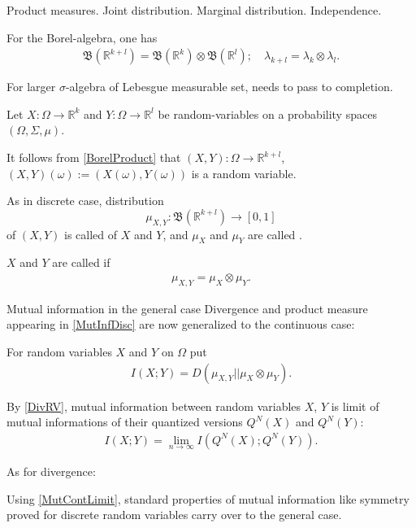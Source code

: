 \begin{frame}{Product measures. Joint distribution. Marginal distribution. Independence.}
\bit
\item For the Borel-algebra, one has
\begin{align}\label{BorelProduct}
\mathfrak{B}(\mathbb{R}^{k+l})=\mathfrak{B}(\mathbb{R}^{k})\otimes\mathfrak{B}(\mathbb{R}^l); \quad 
\lambda_{k+l}=\lambda_{k}\otimes\lambda_l.
\end{align}
\item For larger $\sigma$-algebra of Lebesgue measurable set, needs to pass to completion. 
\eit

\bit 
\item Let $X:\Omega\to\mathbb{R}^k$ and $Y:\Omega\to\mathbb{R}^l$ be random-variables on a probability spaces $(\Omega,\Sigma,\mu)$. 
\item It follows from \eqref{BorelProduct} that $(X,Y):\Omega\to\mathbb{R}^{k+l}$, $(X,Y)(\omega):=(X(\omega),Y(\omega))$ is a random variable. 
\item As in discrete case, distribution
\[
\mu_{X,Y}: \mathfrak{B}(\mathbb{R}^{k+l}) \to[0,1]
\]
of $(X,Y)$ is called  of $X$ and $Y$, and  
$\mu_X$ and $\mu_Y$ are called . 
\item $X$ and $Y$ are called  if 
\begin{align*}
\mu_{X,Y}=\mu_X\otimes\mu_Y. 
\end{align*}  
\eit
\end{frame}

\begin{frame}{Mutual information in the general case} 
Divergence and product measure appearing in \eqref{MutInfDisc} 
are now generalized to the continuous case: 

\bit
\item For random variables $X$ and $Y$ on $\Omega$ put 
\begin{align}\label{MutInfCont}
I(X;Y)=D(\mu_{X,Y}||\mu_X\otimes \mu_Y).
\end{align}
\item By \eqref{DivRV}, mutual information between random variables $X$, $Y$ is limit of mutual informations of their 
quantized versions $Q^N(X)$ and $Q^N(Y)$:
\begin{align}\label{MutContLimit}
I(X;Y)=\lim_{n\to\infty}I(Q^N(X); Q^N(Y)).
\end{align}
\item As for divergence:  
\item Using \eqref{MutContLimit}, standard properties of mutual information like symmetry proved for discrete random variables 
carry over to the general case.  
\eit 
\end{frame}



